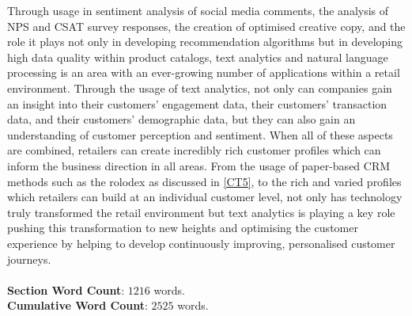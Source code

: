 \documentclass[11pt]{article}
\theoremstyle{plain}
\theoremstyle{definition}
\begin{document}
Through usage in sentiment analysis of social media comments, the analysis of NPS and CSAT survey responses, the creation of optimised creative copy, and the role it plays not only in developing recommendation algorithms but in developing high data quality within product catalogs, text analytics and natural language processing is an area with an ever-growing number of applications within a retail environment. Through the usage of text analytics, not only can companies gain an insight into their customers' engagement data, their customers' transaction data, and their customers' demographic data, but they can also gain an understanding of customer perception and sentiment. When all of these aspects are combined, retailers can create incredibly rich customer profiles which can inform the business direction in all areas. From the usage of paper-based CRM methods such as the rolodex as discussed in \ref{CT5}, to the rich and varied profiles which retailers can build at an individual customer level, not only has technology truly transformed the retail environment but text analytics is playing a key role pushing this transformation to new heights and optimising the customer experience by helping to develop continuously improving, personalised customer journeys.\\
\\
\textbf{Section Word Count}: $1216$ words.\\
\textbf{Cumulative Word Count}: $2525$ words.

\pagebreak
\end{document}

